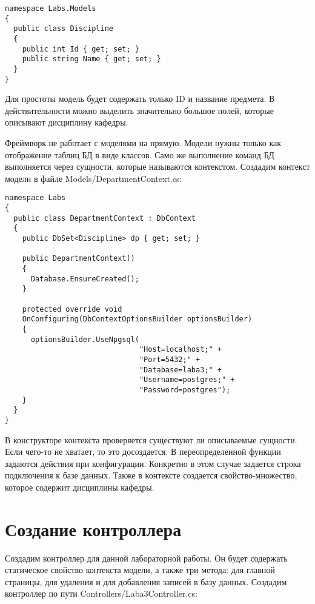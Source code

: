 \begin{verbatim}
namespace Labs.Models
{
  public class Discipline
  {
    public int Id { get; set; }
    public string Name { get; set; }
  }
}
\end{verbatim}

Для простоты модель будет содержать только ID и название предмета. В действительности можно выделить значительно большое полей, которые описывают дисциплину кафедры.

Фреймворк не работает с моделями на прямую. Модели нужны только как отображение таблиц БД в виде классов. Само же выполнение команд БД выполняется через сущности, которые называются контекстом. Создадим контекст модели в файле Models/DepartmentContext.cs:

\begin{verbatim}
namespace Labs
{
  public class DepartmentContext : DbContext
  {
    public DbSet<Discipline> dp { get; set; }
    
    public DepartmentContext()
    {
      Database.EnsureCreated();
    }

    protected override void 
    OnConfiguring(DbContextOptionsBuilder optionsBuilder)
    {
      optionsBuilder.UseNpgsql(
                               "Host=localhost;" +
                               "Port=5432;" +
                               "Database=laba3;" + 
                               "Username=postgres;" + 
                               "Password=postgres");
    }
  }
}
\end{verbatim}

В конструкторе контекста проверяется существуют ли описываемые сущности. Если чего-то не хватает, то это досоздается. В переопределенной функции задаются действия при конфигурации. Конкретно в этом случае задается строка подключения к базе данных. Также в контексте создается свойство-множество, которое содержит дисциплины кафедры.

\section{Создание контроллера}
Создадим контроллер для данной лабораторной работы. Он будет содержать статическое свойство контекста модели, а также три метода: для главной страницы, для удаления и для добавления записей в базу данных. Создадим контроллер по пути Controllers/Laba3Controller.cs:

